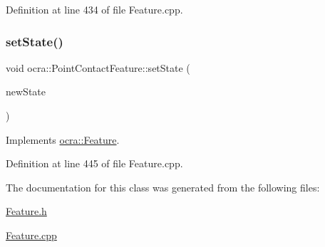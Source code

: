 Definition at line 434 of file Feature.\+cpp.

\hypertarget{classocra_1_1PointContactFeature_ae51b5ff581c698fd63048fbbd964c567}{}\label{classocra_1_1PointContactFeature_ae51b5ff581c698fd63048fbbd964c567} 
\subsubsection{\texorpdfstring{set\+State()}{setState()}}
{\footnotesize\ttfamily void ocra\+::\+Point\+Contact\+Feature\+::set\+State (\begin{DoxyParamCaption}\item[{const \hyperlink{classocra_1_1TaskState}{Task\+State} \&}]{new\+State }\end{DoxyParamCaption})\hspace{0.3cm}{\ttfamily [virtual]}}



Implements \hyperlink{classocra_1_1Feature_ad16d6b176b229280649ab405531e9a30}{ocra\+::\+Feature}.



Definition at line 445 of file Feature.\+cpp.



The documentation for this class was generated from the following files\+:\begin{DoxyCompactItemize}
\item 
\hyperlink{Feature_8h}{Feature.\+h}\item 
\hyperlink{Feature_8cpp}{Feature.\+cpp}\end{DoxyCompactItemize}
